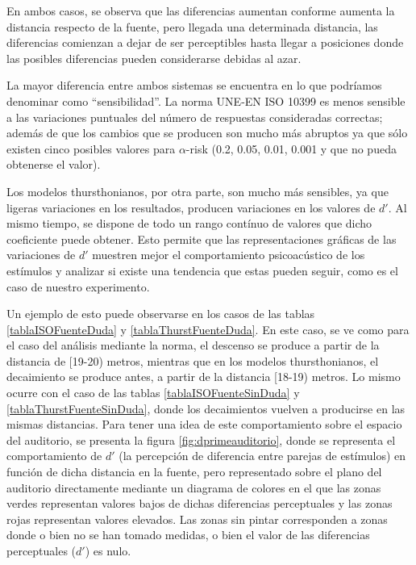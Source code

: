 \documentclass[11pt,a4paper,twoside]{book}
\begin{document}
            En ambos casos, se observa que las diferencias aumentan conforme aumenta la distancia respecto de la fuente, pero llegada una determinada distancia, las diferencias comienzan a dejar de ser perceptibles hasta llegar a posiciones donde las posibles diferencias pueden considerarse debidas al azar.
            
            La mayor diferencia entre ambos sistemas se encuentra en lo que podríamos denominar como ``sensibilidad''. La norma UNE-EN ISO 10399 es menos sensible a las variaciones puntuales del número de respuestas consideradas correctas; además de que los cambios que se producen son mucho más abruptos ya que sólo existen cinco posibles valores para $\alpha$-risk (0.2, 0.05, 0.01, 0.001 y que no pueda obtenerse el valor).
            
            Los modelos thursthonianos, por otra parte, son mucho más sensibles, ya que ligeras variaciones en los resultados, producen variaciones en los valores de $d'$. Al mismo tiempo, se dispone de todo un rango contínuo de valores que dicho coeficiente puede obtener. Esto permite que las representaciones gráficas de las variaciones de $d'$ muestren mejor el comportamiento psicoacústico de los estímulos y analizar si existe una tendencia que estas pueden seguir, como es el caso de nuestro experimento.
            
            Un ejemplo de esto puede observarse en los casos de las tablas \ref{tablaISOFuenteDuda} y \ref{tablaThurstFuenteDuda}. En este caso, se ve como para el caso del análisis mediante la norma, el descenso se produce a partir de la distancia de [19-20) metros, mientras que en los modelos thursthonianos, el decaimiento se produce antes, a partir de la distancia [18-19) metros. Lo mismo ocurre con el caso de las tablas \ref{tablaISOFuenteSinDuda} y \ref{tablaThurstFuenteSinDuda}, donde los decaimientos vuelven a producirse en las mismas distancias. Para tener una idea de este comportamiento sobre el espacio del auditorio, se presenta la figura \ref{fig:dprimeauditorio}, donde se representa el comportamiento de $d'$ (la percepción de diferencia entre parejas de estímulos) en función de dicha distancia en la fuente, pero representado sobre el plano del auditorio directamente mediante un diagrama de colores en el que las zonas verdes representan valores bajos de dichas diferencias perceptuales y las zonas rojas representan valores elevados. Las zonas sin pintar corresponden a zonas donde o bien no se han tomado medidas, o bien el valor de las diferencias perceptuales ($d'$) es nulo.
            
\end{document}
